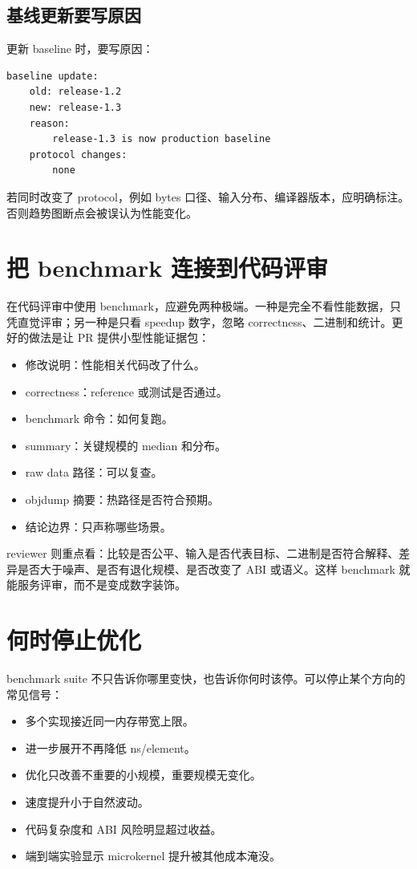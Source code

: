 \subsection{基线更新要写原因}

更新 baseline 时，要写原因：

\begin{lstlisting}
baseline update:
    old: release-1.2
    new: release-1.3
    reason:
        release-1.3 is now production baseline
    protocol changes:
        none
\end{lstlisting}

若同时改变了 protocol，例如 bytes 口径、输入分布、编译器版本，应明确标注。否则趋势图断点会被误认为性能变化。

\section{把 benchmark 连接到代码评审}

在代码评审中使用 benchmark，应避免两种极端。一种是完全不看性能数据，只凭直觉评审；另一种是只看 speedup 数字，忽略 correctness、二进制和统计。更好的做法是让 PR 提供小型性能证据包：

\begin{itemize}
  \item 修改说明：性能相关代码改了什么。
  \item correctness：reference 或测试是否通过。
  \item benchmark 命令：如何复跑。
  \item summary：关键规模的 median 和分布。
  \item raw data 路径：可以复查。
  \item objdump 摘要：热路径是否符合预期。
  \item 结论边界：只声称哪些场景。
\end{itemize}

reviewer 则重点看：比较是否公平、输入是否代表目标、二进制是否符合解释、差异是否大于噪声、是否有退化规模、是否改变了 ABI 或语义。这样 benchmark 就能服务评审，而不是变成数字装饰。

\section{何时停止优化}

benchmark suite 不只告诉你哪里变快，也告诉你何时该停。可以停止某个方向的常见信号：

\begin{itemize}
  \item 多个实现接近同一内存带宽上限。
  \item 进一步展开不再降低 ns/element。
  \item 优化只改善不重要的小规模，重要规模无变化。
  \item 速度提升小于自然波动。
  \item 代码复杂度和 ABI 风险明显超过收益。
  \item 端到端实验显示 microkernel 提升被其他成本淹没。
\end{itemize}

